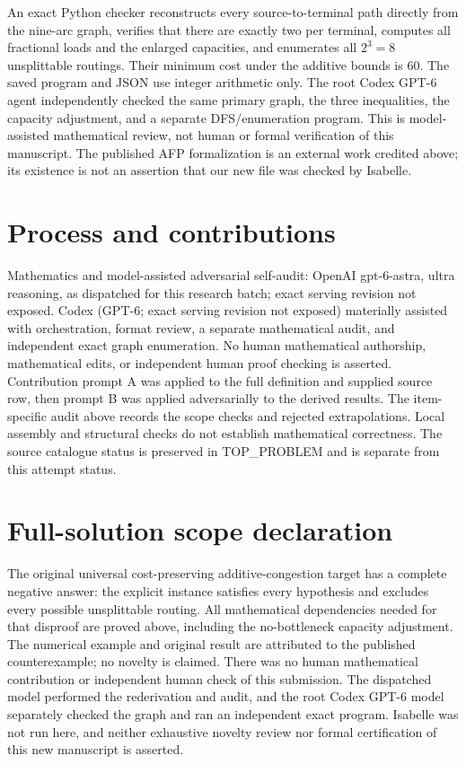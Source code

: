 \documentclass[11pt]{article}
\begin{document}
An exact Python checker reconstructs every source-to-terminal path directly
from the nine-arc graph, verifies that there are exactly two per terminal,
computes all fractional loads and the enlarged capacities, and enumerates
all $2^3=8$ unsplittable routings. Their minimum cost under the additive
bounds is 60. The saved program and JSON use integer arithmetic only.
The root Codex GPT-6 agent independently checked the same primary graph,
the three inequalities, the capacity adjustment, and a separate DFS/enumeration
program. This is model-assisted mathematical review, not human or formal
verification of this manuscript. The published AFP formalization is an
external work credited above; its existence is not an assertion that our
new file was checked by Isabelle.

\section{Process and contributions}
Mathematics and model-assisted adversarial self-audit: OpenAI gpt-6-astra, ultra reasoning, as dispatched for this research batch; exact serving revision not exposed. Codex (GPT-6; exact serving revision not exposed) materially assisted with orchestration, format review, a separate mathematical audit, and independent exact graph enumeration. No human mathematical authorship, mathematical edits, or independent human proof checking is asserted.
Contribution prompt A was applied to the full definition and supplied source row, then prompt B was applied adversarially to the derived results. The item-specific audit above records the scope checks and rejected extrapolations. Local assembly and structural checks do not establish mathematical correctness. The source catalogue status is preserved in TOP\_PROBLEM and is separate from this attempt status.
\section{Full-solution scope declaration}
The original universal cost-preserving additive-congestion target has a complete
negative answer: the explicit instance satisfies every hypothesis and excludes
every possible unsplittable routing. All mathematical dependencies needed for
that disproof are proved above, including the no-bottleneck capacity adjustment.
The numerical example and original result are attributed to the published
counterexample; no novelty is claimed. There was no human mathematical
contribution or independent human check of this submission. The dispatched
model performed the rederivation and audit, and the root Codex GPT-6 model
separately checked the graph and ran an independent exact program. Isabelle
was not run here, and neither exhaustive novelty review nor formal certification
of this new manuscript is asserted.
\end{document}
